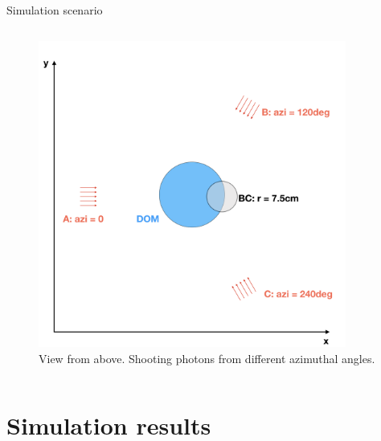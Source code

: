 \begin{frame}[fragile]{Simulation scenario}
\begin{columns}
\begin{column}{0.5\textwidth}
\begin{figure}
        \includegraphics[width=0.9\textwidth]{img/summerscenario-003}
        \caption{View from above. Shooting photons from different azimuthal angles.}
      \end{figure}
    \end{column}
  \end{columns}
\end{frame}

\section{Simulation results}
